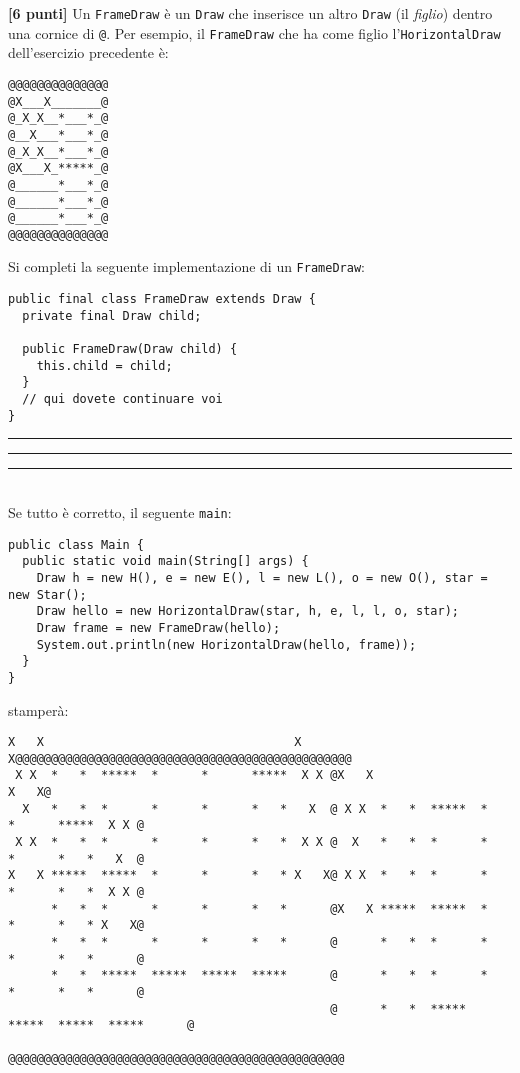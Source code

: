 \documentclass{article}[10pt]
\newcounter{esnu}
\newenvironment{esercizio}{\medskip \noindent {\bf Esercizio\addtocounter{esnu}{1} \arabic{esnu}}}{}
\begin{document}
%
\begin{esercizio}
\textbf{[6 punti]}
Un \texttt{FrameDraw} \`e un \texttt{Draw} che inserisce un altro \texttt{Draw} (il \emph{figlio}) dentro
una cornice di \texttt{@}. Per esempio, il \texttt{FrameDraw} che ha come figlio l'\texttt{HorizontalDraw}
dell'esercizio precedente \`e:
%
{\small
\begin{verbatim}
@@@@@@@@@@@@@@
@X___X_______@
@_X_X__*___*_@
@__X___*___*_@
@_X_X__*___*_@
@X___X_*****_@
@______*___*_@
@______*___*_@
@______*___*_@
@@@@@@@@@@@@@@
\end{verbatim}}

Si completi la seguente implementazione di un \texttt{FrameDraw}:
%
{\small
\begin{verbatim}
public final class FrameDraw extends Draw {
  private final Draw child;

  public FrameDraw(Draw child) {
    this.child = child;
  }
  // qui dovete continuare voi
}
\end{verbatim}}
%
\end{esercizio}
%
\hrule
\hrule
\hrule
\mbox{}\\

Se tutto \`e corretto, il seguente \texttt{main}:
%
{\small
\begin{verbatim}
public class Main {
  public static void main(String[] args) {
    Draw h = new H(), e = new E(), l = new L(), o = new O(), star = new Star();
    Draw hello = new HorizontalDraw(star, h, e, l, l, o, star);
    Draw frame = new FrameDraw(hello);
    System.out.println(new HorizontalDraw(hello, frame));
  }
}
\end{verbatim}}

\noindent
stamper\`a:
%
{\small
\begin{verbatim}
X   X                                   X   X@@@@@@@@@@@@@@@@@@@@@@@@@@@@@@@@@@@@@@@@@@@@@@@
 X X  *   *  *****  *      *      *****  X X @X   X                                   X   X@
  X   *   *  *      *      *      *   *   X  @ X X  *   *  *****  *      *      *****  X X @
 X X  *   *  *      *      *      *   *  X X @  X   *   *  *      *      *      *   *   X  @
X   X *****  *****  *      *      *   * X   X@ X X  *   *  *      *      *      *   *  X X @
      *   *  *      *      *      *   *      @X   X *****  *****  *      *      *   * X   X@
      *   *  *      *      *      *   *      @      *   *  *      *      *      *   *      @
      *   *  *****  *****  *****  *****      @      *   *  *      *      *      *   *      @
                                             @      *   *  *****  *****  *****  *****      @
                                             @@@@@@@@@@@@@@@@@@@@@@@@@@@@@@@@@@@@@@@@@@@@@@@
\end{verbatim}}
%
\end{document}
